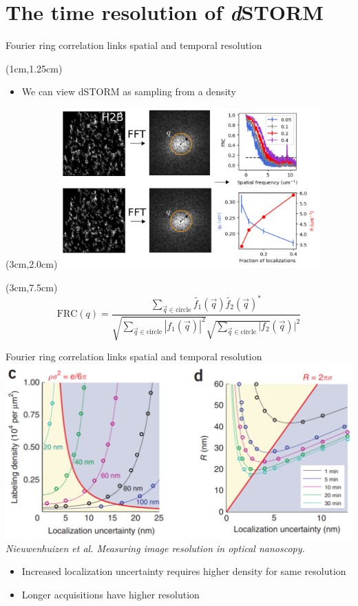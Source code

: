 \documentclass{beamer}					%
\begin{document}
\section{The time resolution of \textit{d}STORM}
\begin{frame}{Fourier ring correlation links spatial and temporal resolution}
\begin{textblock*}{13cm}(1cm,1.25cm)
\begin{itemize}
\item We can view dSTORM as sampling from a density
\end{itemize}
\end{textblock*}
\begin{textblock*}{10cm}(3cm,2.0cm)
\includegraphics[width=10cm]{FRC.png}
\end{textblock*}
\begin{textblock*}{8cm}(3cm,7.5cm)
\begin{equation*}
\mathrm{FRC}(q) = \frac{\sum_{\vec{q}\in\mathrm{circle}}\tilde{f_{1}}(\vec{q})\tilde{f_{2}}(\vec{q})^{*}}{\sqrt{\sum_{\vec{q}\in\mathrm{circle}}|f_{1}(\vec{q})|^{2}}\sqrt{\sum_{\vec{q}\in\mathrm{circle}}|f_{2}}(\vec{q})|^{2}}
\end{equation*}
\end{textblock*}
\end{frame}

\begin{frame}{Fourier ring correlation links spatial and temporal resolution}
\includegraphics[width=\textwidth]{Spatial.png}
\textit{Nieuwenhuizen et al. Measuring image resolution in optical nanoscopy.}\\
\begin{itemize}
\item Increased localization uncertainty requires higher density for same resolution
\item Longer acquisitions have higher resolution
\end{itemize}

\end{frame}
\end{document}
